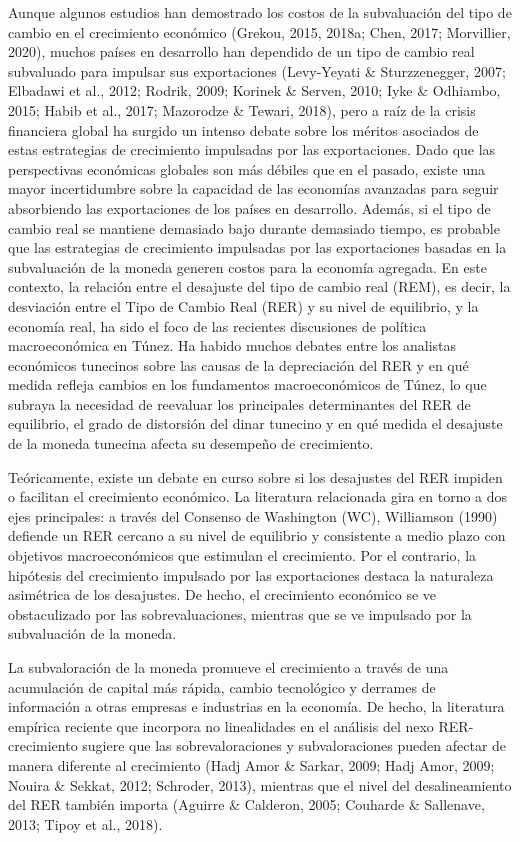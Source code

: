 \documentclass[11pt,a4paper]{article}
\begin{document}
Aunque algunos estudios han demostrado los costos de la subvaluación del tipo de cambio en el crecimiento económico (Grekou, 2015, 2018a; Chen, 2017; Morvillier, 2020), muchos países en desarrollo han dependido de un tipo de cambio real subvaluado para impulsar sus exportaciones (Levy-Yeyati \& Sturzzenegger, 2007; Elbadawi et al., 2012; Rodrik, 2009; Korinek \& Serven, 2010; Iyke \& Odhiambo, 2015; Habib et al., 2017; Mazorodze \& Tewari, 2018), pero a raíz de la crisis financiera global ha surgido un intenso debate sobre los méritos asociados de estas estrategias de crecimiento impulsadas por las exportaciones. Dado que las perspectivas económicas globales son más débiles que en el pasado, existe una mayor incertidumbre sobre la capacidad de las economías avanzadas para seguir absorbiendo las exportaciones de los países en desarrollo. Además, si el tipo de cambio real se mantiene demasiado bajo durante demasiado tiempo, es probable que las estrategias de crecimiento impulsadas por las exportaciones basadas en la subvaluación de la moneda generen costos para la economía agregada. En este contexto, la relación entre el desajuste del tipo de cambio real (REM), es decir, la desviación entre el Tipo de Cambio Real (RER) y su nivel de equilibrio, y la economía real, ha sido el foco de las recientes discusiones de política macroeconómica en Túnez. Ha habido muchos debates entre los analistas económicos tunecinos sobre las causas de la depreciación del RER y en qué medida refleja cambios en los fundamentos macroeconómicos de Túnez, lo que subraya la necesidad de reevaluar los principales determinantes del RER de equilibrio, el grado de distorsión del dinar tunecino y en qué medida el desajuste de la moneda tunecina afecta su desempeño de crecimiento.

Teóricamente, existe un debate en curso sobre si los desajustes del RER impiden o facilitan el crecimiento económico. La literatura relacionada gira en torno a dos ejes principales: a través del Consenso de Washington (WC), Williamson (1990) defiende un RER cercano a su nivel de equilibrio y consistente a medio plazo con objetivos macroeconómicos que estimulan el crecimiento. Por el contrario, la hipótesis del crecimiento impulsado por las exportaciones destaca la naturaleza asimétrica de los desajustes. De hecho, el crecimiento económico se ve obstaculizado por las sobrevaluaciones, mientras que se ve impulsado por la subvaluación de la moneda.

La subvaloración de la moneda promueve el crecimiento a través de una acumulación de capital más rápida, cambio tecnológico y derrames de información a otras empresas e industrias en la economía. De hecho, la literatura empírica reciente que incorpora no linealidades en el análisis del nexo RER-crecimiento sugiere que las sobrevaloraciones y subvaloraciones pueden afectar de manera diferente al crecimiento (Hadj Amor \& Sarkar, 2009; Hadj Amor, 2009; Nouira \& Sekkat, 2012; Schroder, 2013), mientras que el nivel del desalineamiento del RER también importa (Aguirre \& Calderon, 2005; Couharde \& Sallenave, 2013; Tipoy et al., 2018).
\end{document}
